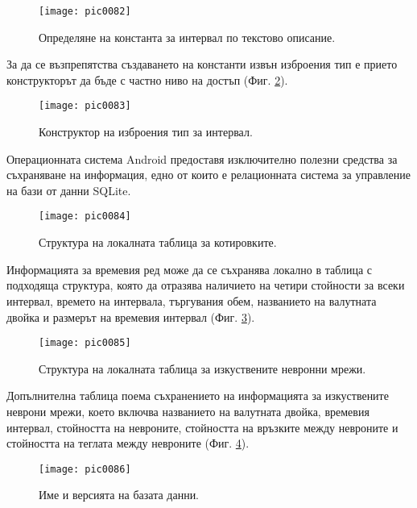 \begin{figure}[h]
  \centering
  \texttt{[image: pic0082]}
  \caption{Определяне на константа за интервал по текстово описание.}
\label{fig:pic0082}
\end{figure}
\FloatBarrier

За да се възпрепятства създаването на константи извън изброения тип е прието конструкторът да бъде с частно ниво на достъп (Фиг. \ref{fig:pic0083}).

\begin{figure}[h]
  \centering
  \texttt{[image: pic0083]}
  \caption{Конструктор на изброения тип за интервал.}
\label{fig:pic0083}
\end{figure}
\FloatBarrier

Операционната система Android предоставя изключително полезни средства за съхраняване на информация, едно от които е релационната система за управление на бази от данни SQLite. 

\begin{figure}[h]
  \centering
  \texttt{[image: pic0084]}
  \caption{Структура на локалната таблица за котировките.}
\label{fig:pic0084}
\end{figure}
\FloatBarrier

Информацията за времевия ред може да се съхранява локално в таблица с подходяща структура, която да отразява наличието на четири стойности за всеки интервал, времето на интервала, търгувания обем, названието на валутната двойка и размерът на времевия интервал (Фиг. \ref{fig:pic0084}).

\begin{figure}[h]
  \centering
  \texttt{[image: pic0085]}
  \caption{Структура на локалната таблица за изкуствените невронни мрежи.}
\label{fig:pic0085}
\end{figure}
\FloatBarrier

Допълнителна таблица поема съхранението на информацията за изкуствените неврони мрежи, което включва названието на валутната двойка, времевия интервал, стойността на невроните, стойността на връзките между невроните и стойността на теглата между невроните (Фиг. \ref{fig:pic0085}). 

\begin{figure}[h]
  \centering
  \texttt{[image: pic0086]}
  \caption{Име и версията на базата данни.}
\label{fig:pic0086}
\end{figure}
\FloatBarrier

